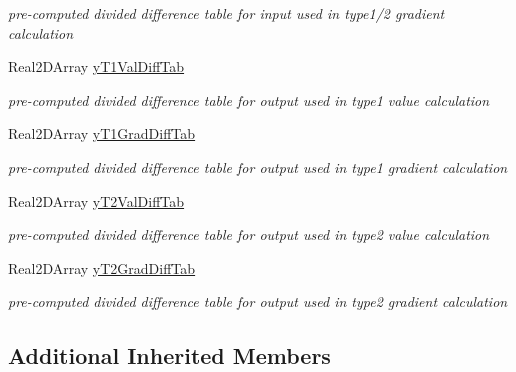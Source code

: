 \begin{DoxyCompactItemize}
\begin{DoxyCompactList}\small\item\em pre-\/computed divided difference table for input used in type1/2 gradient calculation \end{DoxyCompactList}\item 
Real2\+D\+Array \hyperlink{classPecos_1_1HermiteInterpPolynomial_a1a81078384a8ade468939ac1f4dffd00}{y\+T1\+Val\+Diff\+Tab}\label{classPecos_1_1HermiteInterpPolynomial_a1a81078384a8ade468939ac1f4dffd00}

\begin{DoxyCompactList}\small\item\em pre-\/computed divided difference table for output used in type1 value calculation \end{DoxyCompactList}\item 
Real2\+D\+Array \hyperlink{classPecos_1_1HermiteInterpPolynomial_a6941217fd7ac71c812db0263c3e11672}{y\+T1\+Grad\+Diff\+Tab}\label{classPecos_1_1HermiteInterpPolynomial_a6941217fd7ac71c812db0263c3e11672}

\begin{DoxyCompactList}\small\item\em pre-\/computed divided difference table for output used in type1 gradient calculation \end{DoxyCompactList}\item 
Real2\+D\+Array \hyperlink{classPecos_1_1HermiteInterpPolynomial_abbc8c4a533b3d75a2759cdceeb25c282}{y\+T2\+Val\+Diff\+Tab}\label{classPecos_1_1HermiteInterpPolynomial_abbc8c4a533b3d75a2759cdceeb25c282}

\begin{DoxyCompactList}\small\item\em pre-\/computed divided difference table for output used in type2 value calculation \end{DoxyCompactList}\item 
Real2\+D\+Array \hyperlink{classPecos_1_1HermiteInterpPolynomial_ac3605e3ae157a842df05bc016eeb777b}{y\+T2\+Grad\+Diff\+Tab}\label{classPecos_1_1HermiteInterpPolynomial_ac3605e3ae157a842df05bc016eeb777b}

\begin{DoxyCompactList}\small\item\em pre-\/computed divided difference table for output used in type2 gradient calculation \end{DoxyCompactList}\end{DoxyCompactItemize}
\subsection*{Additional Inherited Members}


